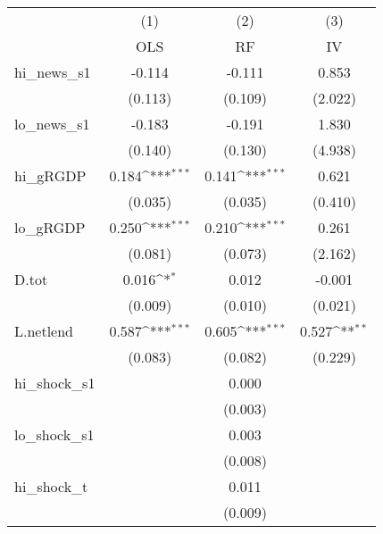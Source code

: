 {
\def\sym#1{\ifmmode^{#1}\else\(^{#1}\)\fi}
\begin{tabular}{l*{3}{c}}
\toprule
            &\multicolumn{1}{c}{(1)}&\multicolumn{1}{c}{(2)}&\multicolumn{1}{c}{(3)}\\
            &\multicolumn{1}{c}{OLS}&\multicolumn{1}{c}{RF}&\multicolumn{1}{c}{IV}\\
\midrule
hi\_news\_s1  &      -0.114         &      -0.111         &       0.853         \\
            &     (0.113)         &     (0.109)         &     (2.022)         \\
\addlinespace
lo\_news\_s1  &      -0.183         &      -0.191         &       1.830         \\
            &     (0.140)         &     (0.130)         &     (4.938)         \\
\addlinespace
hi\_gRGDP    &       0.184\sym{***}&       0.141\sym{***}&       0.621         \\
            &     (0.035)         &     (0.035)         &     (0.410)         \\
\addlinespace
lo\_gRGDP    &       0.250\sym{***}&       0.210\sym{***}&       0.261         \\
            &     (0.081)         &     (0.073)         &     (2.162)         \\
\addlinespace
D.tot       &       0.016\sym{*}  &       0.012         &      -0.001         \\
            &     (0.009)         &     (0.010)         &     (0.021)         \\
\addlinespace
L.netlend   &       0.587\sym{***}&       0.605\sym{***}&       0.527\sym{**} \\
            &     (0.083)         &     (0.082)         &     (0.229)         \\
\addlinespace
hi\_shock\_s1 &                     &       0.000         &                     \\
            &                     &     (0.003)         &                     \\
\addlinespace
lo\_shock\_s1 &                     &       0.003         &                     \\
            &                     &     (0.008)         &                     \\
\addlinespace
hi\_shock\_t  &                     &       0.011         &                     \\
            &                     &     (0.009)         &                     \\

\end{tabular}}
